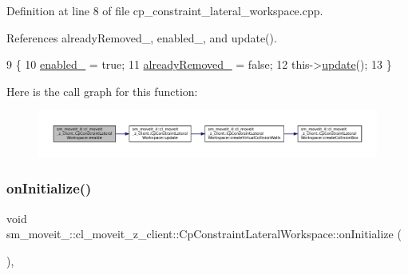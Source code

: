 Definition at line 8 of file cp\+\_\+constraint\+\_\+lateral\+\_\+workspace.\+cpp.



References already\+Removed\+\_\+, enabled\+\_\+, and update().


\begin{DoxyCode}
9         \{
10             \hyperlink{classsm__moveit__4_1_1cl__moveit__z__client_1_1CpConstraintLateralWorkspace_a869220e440aadc79cf5213b6d27c1217}{enabled\_} = \textcolor{keyword}{true};
11             \hyperlink{classsm__moveit__4_1_1cl__moveit__z__client_1_1CpConstraintLateralWorkspace_a9d195448b13cc11a2043197ee4885e05}{alreadyRemoved\_} = \textcolor{keyword}{false};
12             this->\hyperlink{classsm__moveit__4_1_1cl__moveit__z__client_1_1CpConstraintLateralWorkspace_a1b96546a90ecd3ce10a73b65ff5fcf35}{update}();
13         \}
\end{DoxyCode}
Here is the call graph for this function\+:
\nopagebreak
\begin{figure}[H]
\begin{center}
\leavevmode
\includegraphics[width=350pt]{classsm__moveit__4_1_1cl__moveit__z__client_1_1CpConstraintLateralWorkspace_afa4487214f0213724159264de374267b_cgraph}
\end{center}
\end{figure}
\mbox{\label{classsm__moveit__4_1_1cl__moveit__z__client_1_1CpConstraintLateralWorkspace_a78085a604bdc75b6678825580a79b304}} 
\subsubsection{\texorpdfstring{on\+Initialize()}{onInitialize()}}
{\footnotesize\ttfamily void sm\+\_\+moveit\+\_\+::cl\+\_\+moveit\+\_\+z\+\_\+client\+::\+Cp\+Constraint\+Lateral\+Workspace\+::on\+Initialize (\begin{DoxyParamCaption}{ }\end{DoxyParamCaption})\hspace{0.3cm}{\ttfamily [override]}, {\ttfamily [virtual]}}



